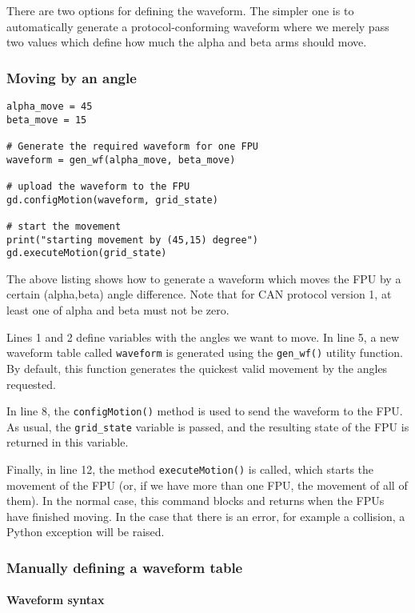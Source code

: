 \documentclass{scrartcl}[12pt,a4paper]
\begin{document}
There are two options for defining the waveform. The simpler one is to
automatically generate a protocol-conforming waveform where we merely
pass two values which define how much the alpha and beta arms should
move.

\subsubsection{Moving by an angle}

\begin{verbatim}
alpha_move = 45
beta_move = 15

# Generate the required waveform for one FPU
waveform = gen_wf(alpha_move, beta_move)

# upload the waveform to the FPU
gd.configMotion(waveform, grid_state)

# start the movement
print("starting movement by (45,15) degree")
gd.executeMotion(grid_state)
\end{verbatim}

The above listing shows how to generate a waveform which moves the FPU
by a certain (alpha,beta) angle difference. Note that for CAN protocol
version 1, at least one of alpha and beta must not be zero.

Lines 1 and 2 define variables with the angles we want to move. In
line 5, a new waveform table called \texttt{waveform} is generated
using the \texttt{gen\_wf()} utility function.  By default, this
function generates the quickest valid movement by the angles
requested.

In line 8, the \texttt{configMotion()} method is used to send the
waveform to the FPU. As usual, the \texttt{grid\_state} variable is
passed, and the resulting state of the FPU is returned in this
variable.

Finally, in line 12, the method \texttt{executeMotion()} is called,
which starts the movement of the FPU (or, if we have more than one
FPU, the movement of all of them). In the normal case, this command
blocks and returns when the FPUs have finished moving.  In the case
that there is an error, for example a collision, a Python exception
will be raised.



\subsubsection{Manually defining a waveform table}

\paragraph{Waveform syntax}
\end{document}
